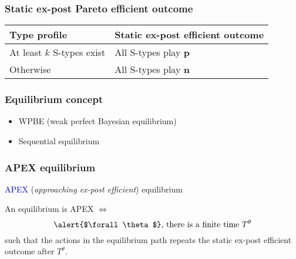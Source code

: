 \documentclass[10pt]{beamer}
\begin{document}
\begin{frame}
  \frametitle{Static ex-post Pareto efficient outcome}



\begin{table}[h]
\begin{tabular}{ll}
Type profile & Static ex-post efficient outcome \\
\hline
At least $k$ S-types exist & All S-types play \textbf{p}  \\
Otherwise &  All S-types play \textbf{n} 
\end{tabular}
\end{table}
\end{frame}




\begin{frame}
  \frametitle{Equilibrium concept}

\begin{itemize}
\item WPBE (weak perfect Bayesian equilibrium)
\item Sequential equilibrium
\end{itemize}
\end{frame}


\begin{frame}
  \frametitle{APEX equilibrium}

\textcolor{blue}{APEX} (\textit{approaching ex-post efficient}) equilibrium

\begin{definition}
An equilibrium is APEX $\Leftrightarrow$ 
\[\text{\alert{$\forall\theta$},  there is a finite time $T^{\theta}$}\] 
such that the actions in the equilibrium path repeats the static ex-post efficient outcome after $T^{\theta}$. 
\end{definition}

\end{frame}
\end{document}
